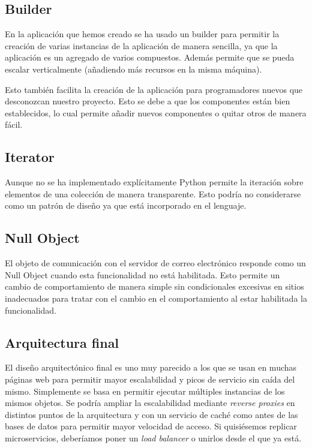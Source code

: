 \subsection{Builder}

En la aplicación que hemos creado se ha usado un builder para permitir la creación de varias instancias de la aplicación de manera sencilla, ya que la aplicación es un agregado de varios compuestos. Además permite que se pueda escalar verticalmente (añadiendo más recursos en la misma máquina).

Esto también facilita la creación de la aplicación para programadores nuevos que desconozcan nuestro proyecto. Esto se debe a que los componentes están bien establecidos, lo cual permite añadir nuevos componentes o quitar otros de manera fácil.


\subsection{Iterator}
Aunque no se ha implementado explícitamente Python permite la iteración sobre elementos de una colección de manera transparente. Esto podría no considerarse como un patrón de diseño ya que está incorporado en el lenguaje.


\subsection{Null Object}
El objeto de comunicación con el servidor de correo electrónico responde como un Null Object cuando esta funcionalidad no está habilitada. Esto permite un cambio de comportamiento de manera simple sin condicionales excesivas en sitios inadecuados para tratar con el cambio en el comportamiento al estar habilitada la funcionalidad.


\subsection{Arquitectura final}

El diseño arquitectónico final es uno muy parecido a los que se usan en muchas páginas web para permitir mayor escalabilidad y picos de servicio sin caída del mismo. Simplemente se basa en permitir ejecutar múltiples instancias de los mismos objetos. Se podría ampliar la escalabilidad mediante \emph{reverse proxies} en distintos puntos de la arquitectura y con un servicio de caché como  antes de las bases de datos para permitir mayor velocidad de acceso. Si quisiésemos replicar microservicios, deberíamos poner un \emph{load balancer} o unirlos desde el que ya está.


